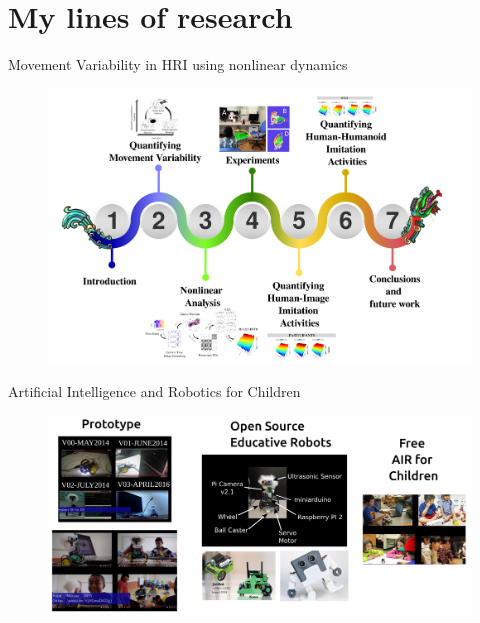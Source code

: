 \section{My lines of research}


{
\begin{frame}{Movement Variability in HRI using nonlinear dynamics}
    \vspace{-00mm}
      \begin{figure}
        \centering
        \includegraphics[width=0.8\linewidth]{./figs/oa-thesis/versions/drawing-v00.png}
        \caption{}
      \end{figure}
\end{frame}
}




{
\begin{frame}{Artificial Intelligence and Robotics for Children}
    \vspace{-00mm}
      \begin{figure}
        \centering
        \includegraphics[width=0.99\linewidth]{./figs/air4children/versions/drawing-v00.png}
        \caption{}
      \end{figure}
\end{frame}
}


